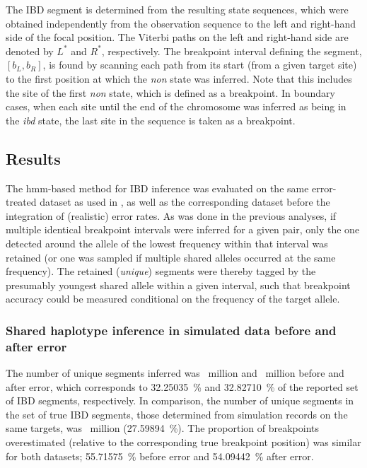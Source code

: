 The IBD segment is determined from the  resulting state sequences, which were obtained independently from the observation sequence to the left and right-hand side of the focal position.
The Viterbi paths on the left and right-hand side are denoted by $L^\ast$ and $R^\ast$, respectively.
The breakpoint interval defining the segment, ${[b_L, b_R]}$, is found by scanning each path from its start (\ie from a given target site) to the first position at which the \emph{non} state was inferred.
Note that this includes the site of the first \emph{non} state, which is defined as a breakpoint.
In boundary cases, when each site until the end of the chromosome was inferred as being in the \emph{ibd} state, the last site in the sequence is taken as a breakpoint.





%
\subsection{Results}
%


The \gls{hmm}-based method for IBD inference was evaluated on the same error-treated dataset as used in , as well as the corresponding dataset before the integration of (realistic) error rates.
As was done in the previous analyses, if multiple identical breakpoint intervals were inferred for a given pair, only the one detected around the allele of the lowest frequency within that interval was retained (or one was sampled if multiple shared alleles occurred at the same frequency).
The retained (\emph{unique}) segments were thereby tagged by the presumably youngest shared allele within a given interval, such that breakpoint accuracy could be measured conditional on the frequency of the target allele.


%
\subsubsection{Shared haplotype inference in simulated data before and after error}
%

The number of unique segments inferred was
~million and
~million before and after error, which corresponds to
\SI{32.25035}{\percent} and
\SI{32.82710}{\percent} of the reported set of IBD segments, respectively.
In comparison, the number of unique segments in the set of true IBD segments, those determined from simulation records on the same targets, was
~million (\SI{27.59894}{\percent}).
The proportion of breakpoints overestimated (relative to the corresponding true breakpoint position) was similar for both datasets;
\SI{55.71575}{\percent} before error and
\SI{54.09442}{\percent} after error.

